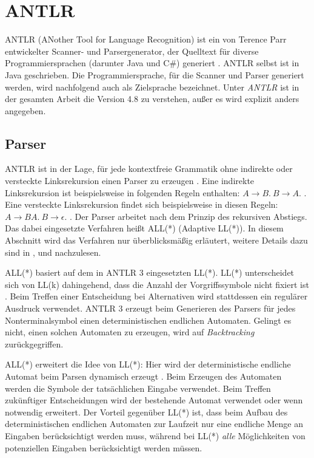\section{ANTLR}

ANTLR (ANother Tool for Language Recognition) ist ein von Terence Parr entwickelter Scanner- und Parsergenerator, der Quelltext für diverse Programmiersprachen (darunter Java und C\#{}) generiert \cite{ANTLR4Reference} \cite{ANTLRWebsite}. ANTLR selbst ist in Java geschrieben. Die Programmiersprache, für die Scanner und Parser generiert werden, wird nachfolgend auch als Zielsprache bezeichnet. Unter \emph{ANTLR} ist in der gesamten Arbeit die Version 4.8 zu verstehen, außer es wird explizit anders angegeben.

\subsection{Parser}

ANTLR ist in der Lage, für jede kontextfreie Grammatik ohne indirekte oder versteckte Linksrekursion einen Parser zu erzeugen \cite{ANTLRALLStar}. Eine indirekte Linksrekursion ist beispielsweise in folgenden Regeln enthalten: $A \rightarrow B.\ B \rightarrow A.$ \cite{ANTLRALLStar}. Eine versteckte Linksrekursion findet sich beispielsweise in diesen Regeln: $A \rightarrow B A.\ B \rightarrow \epsilon.$ \cite{ANTLRALLStar}. Der Parser arbeitet nach dem Prinzip des rekursiven Abstiegs. Das dabei eingesetzte Verfahren heißt ALL(*) (Adaptive LL(*)). In diesem Abschnitt wird das Verfahren nur überblicksmäßig erläutert, weitere Details dazu sind in \cite{ANTLR4Reference}, \cite{ANTLRLLStar} und \cite{ANTLRALLStar} nachzulesen.

ALL(*) basiert auf dem in ANTLR 3 eingesetzten LL(*). LL(*) unterscheidet sich von LL(k) dahingehend, dass die Anzahl der Vorgriffssymbole nicht fixiert ist \cite{ANTLRLLStar}. Beim Treffen einer Entscheidung bei Alternativen wird stattdessen ein regulärer Ausdruck verwendet. ANTLR 3 erzeugt beim Generieren des Parsers für jedes Nonterminalsymbol einen deterministischen endlichen Automaten. Gelingt es nicht, einen solchen Automaten zu erzeugen, wird auf \emph{Backtracking} zurückgegriffen.

ALL(*) erweitert die Idee von LL(*): Hier wird der deterministische endliche Automat beim Parsen dynamisch erzeugt \cite{ANTLRALLStar}. Beim Erzeugen des Automaten werden die Symbole der tatsächlichen Eingabe verwendet. Beim Treffen zukünftiger Entscheidungen wird der bestehende Automat verwendet oder wenn notwendig erweitert. Der Vorteil gegenüber LL(*) ist, dass beim Aufbau des deterministischen endlichen Automaten zur Laufzeit nur eine endliche Menge an Eingaben berücksichtigt werden muss, während bei LL(*) \emph{alle} Möglichkeiten von potenziellen Eingaben berücksichtigt werden müssen.

